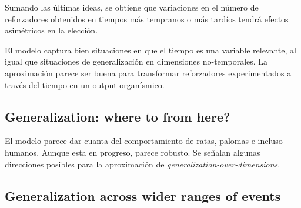 \documentclass[a4paper,12pt]{article}
\begin{document}
Sumando las últimas ideas, se obtiene que variaciones en el número de reforzadores obtenidos en tiempos más tempranos o más tardíos tendrá efectos asimétricos en la elección.

El modelo captura bien situaciones en que el tiempo es una variable relevante, al igual que situaciones de generalización en dimensiones no-temporales. La aproximación parece ser buena para transformar reforzadores experimentados a través del tiempo en un output organísmico.

\subsection{Generalization: where to from here?}

El modelo parece dar cuanta del comportamiento de ratas, palomas e incluso humanos. Aunque esta en progreso, parece robusto. Se señalan algunas direcciones posibles para la aproximación de {\itshape generalization-over-dimensions}.

\subsection{Generalization across wider ranges of events}
\end{document}
